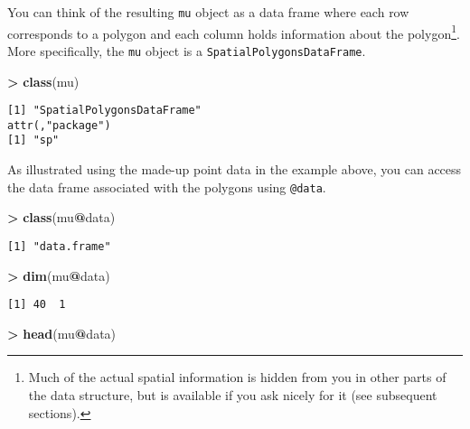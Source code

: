 \documentclass[]{krantz}
\makeatletter
\newenvironment{Shaded}{\begin{snugshade}}{\end{snugshade}}
\newcommand{\KeywordTok}[1]{\textcolor[rgb]{0.27,0.27,0.27}{\textbf{#1}}}
\newcommand{\StringTok}[1]{\textcolor[rgb]{0.5,0.5,0.5}{#1}}
\newcommand{\OperatorTok}[1]{\textcolor[rgb]{0.43,0.43,0.43}{\textbf{#1}}}
\newcommand{\NormalTok}[1]{#1}
\newenvironment{kframe}{%
\medskip{}
\setlength{\fboxsep}{.8em}
 \def\at@end@of@kframe{}%
 \ifinner\ifhmode%
  \def\at@end@of@kframe{\end{minipage}}%
  \begin{minipage}{\columnwidth}%
 \fi\fi%
 \def\FrameCommand##1{\hskip\@totalleftmargin \hskip-\fboxsep
 \colorbox{shadecolor}{##1}\hskip-\fboxsep
     \hskip-\linewidth \hskip-\@totalleftmargin \hskip\columnwidth}%
 \MakeFramed {\advance\hsize-\width
   \@totalleftmargin\z@ \linewidth\hsize
   \@setminipage}}%
 {\par\unskip\endMakeFramed%
 \at@end@of@kframe}
\renewenvironment{Shaded}{\begin{kframe}}{\end{kframe}}
\theoremstyle{definition}
\theoremstyle{definition}
\theoremstyle{definition}
\theoremstyle{remark}
\makeatother
\begin{document}
You can think of the resulting \texttt{mu} object as a data frame where
each row corresponds to a polygon and each column holds information
about the polygon\footnote{Much of the actual spatial information is
  hidden from you in other parts of the data structure, but is available
  if you ask nicely for it (see subsequent sections).}. More
specifically, the \texttt{mu} object is a
\texttt{SpatialPolygonsDataFrame}.

\begin{Shaded}
\begin{Highlighting}[]
\OperatorTok{>}\StringTok{ }\KeywordTok{class}\NormalTok{(mu)}
\end{Highlighting}
\end{Shaded}

\begin{verbatim}
[1] "SpatialPolygonsDataFrame"
attr(,"package")
[1] "sp"
\end{verbatim}

As illustrated using the made-up point data in the example above, you
can access the data frame associated with the polygons using
\texttt{@data}.

\begin{Shaded}
\begin{Highlighting}[]
\OperatorTok{>}\StringTok{ }\KeywordTok{class}\NormalTok{(mu}\OperatorTok{@}\NormalTok{data)}
\end{Highlighting}
\end{Shaded}

\begin{verbatim}
[1] "data.frame"
\end{verbatim}

\begin{Shaded}
\begin{Highlighting}[]
\OperatorTok{>}\StringTok{ }\KeywordTok{dim}\NormalTok{(mu}\OperatorTok{@}\NormalTok{data)}
\end{Highlighting}
\end{Shaded}

\begin{verbatim}
[1] 40  1
\end{verbatim}

\begin{Shaded}
\begin{Highlighting}[]
\OperatorTok{>}\StringTok{ }\KeywordTok{head}\NormalTok{(mu}\OperatorTok{@}\NormalTok{data)}
\end{Highlighting}
\end{Shaded}
\end{document}
